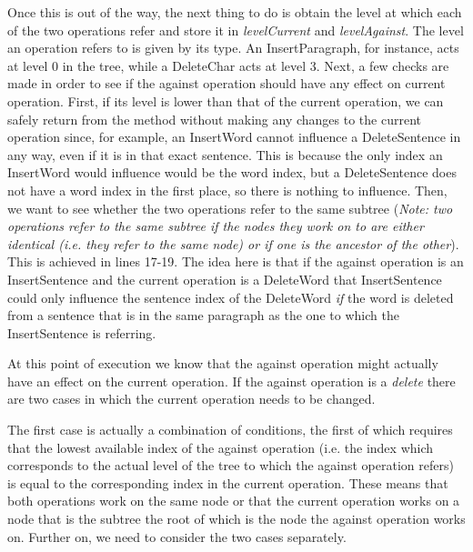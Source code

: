 Once this is out of the way, the next thing to do is obtain the level at which
each of the two operations refer and store it in \emph{levelCurrent} and
\emph{levelAgainst}. The level an operation refers to is given by its type.
An InsertParagraph, for instance, acts at level 0 in the tree, while a DeleteChar
acts at level 3.  Next, a few checks are made in order to see if the against
operation should have any effect on current operation. First, if its level
is lower than that of the current operation, we can safely return from the
method without making any changes to the current operation since, for example,
an InsertWord cannot influence a DeleteSentence in any way, even if it is in
that exact sentence. This is because the only index an InsertWord would influence
would be the word index, but a DeleteSentence does not have a word index in the
first place, so there is nothing to influence. Then, we want to see whether the
two operations refer to the same subtree (\emph{Note: two operations refer to
the same subtree if the nodes they work on to are either identical (i.e. they refer
to the same node) or if one is the ancestor of the other}). This is achieved in
lines 17-19. The idea here is that if the against operation is an InsertSentence
and the current operation is a DeleteWord that InsertSentence could only influence
the sentence index of the DeleteWord \emph{if} the word is deleted from a sentence
that is in the same paragraph as the one to which the InsertSentence is referring.

At this point of execution we know that the against operation might actually
have an effect on the current operation. If the against operation is a \emph{delete}
there are two cases in which the current operation needs to be changed.

The first case is actually a combination of conditions, the first of which requires
that the lowest available index of the against operation (i.e. the index
which corresponds to the actual level of the tree to which the against operation
refers) is equal to the corresponding index in the current operation. These means
that both operations work on the same node or that the current operation works on
a node that is the subtree the root of which is the node the against operation
works on. Further on, we need to consider the two cases separately.

